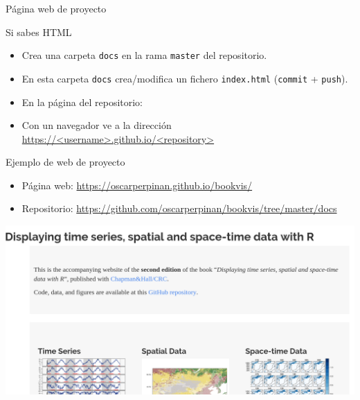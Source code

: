\documentclass[xcolor={usenames,svgnames,dvipsnames}]{beamer}
\begin{document}
\begin{frame}[label={sec:org415c7aa},fragile]{Página web de \alert{proyecto}}
 \begin{block}{Si sabes HTML}
\begin{itemize}
\item Crea una carpeta \texttt{docs} en la rama \texttt{master} del repositorio.

\item En esta carpeta \texttt{docs} crea/modifica un fichero \texttt{index.html} (\texttt{commit} + \texttt{push}).

\item En la página del repositorio:
\end{itemize}

\begin{center}
\end{center}

\begin{itemize}
\item Con un navegador ve a la dirección \url{https://<username>.github.io/<repository>}
\end{itemize}
\end{block}
\end{frame}
\begin{frame}[label={sec:org186b8da}]{Ejemplo de web de \alert{proyecto}}
\begin{itemize}
\item Página web: \url{https://oscarperpinan.github.io/bookvis/}
\item Repositorio: \url{https://github.com/oscarperpinan/bookvis/tree/master/docs}
\end{itemize}

\begin{center}
\includegraphics[width=.9\linewidth]{figs/captura_bookvis.png}
\end{center}
\end{frame}
\end{document}
